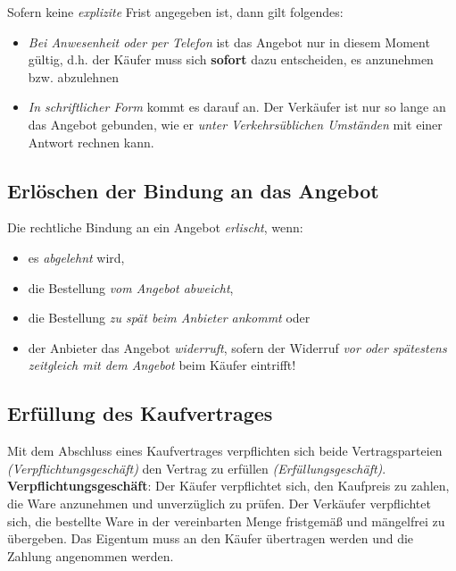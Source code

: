 \documentclass[a4paper, 12pt]{report}
\begin{document}
Sofern keine \emph{explizite} Frist angegeben ist, dann gilt folgendes: 

\begin{itemize}
    \item \emph{Bei Anwesenheit oder per Telefon} ist das Angebot nur in diesem
        Moment gültig, d.h. der Käufer muss sich \textbf{sofort} dazu 
        entscheiden, es anzunehmen bzw. abzulehnen
    \item \emph{In schriftlicher Form} kommt es darauf an. Der Verkäufer ist nur 
        so lange an das Angebot gebunden, wie er \emph{unter Verkehrsüblichen 
        Umständen} mit einer Antwort rechnen kann.
\end{itemize}

\subsection{Erlöschen der Bindung an das Angebot}

Die rechtliche Bindung an ein Angebot \emph{erlischt}, wenn:

\begin{itemize}
    \item es \emph{abgelehnt} wird, 
    \item die Bestellung \emph{vom Angebot abweicht},
    \item die Bestellung \emph{zu spät beim Anbieter ankommt} oder 
    \item der Anbieter das Angebot \emph{widerruft}, sofern der Widerruf \emph{
        vor oder spätestens zeitgleich mit dem Angebot} beim Käufer 
        eintrifft!
\end{itemize}

\subsection{Erfüllung des Kaufvertrages}

Mit dem Abschluss eines Kaufvertrages verpflichten sich beide Vertragsparteien
\emph{(Verpflichtungsgeschäft)} den Vertrag zu erfüllen 
\emph{(Erfüllungsgeschäft)}. \\

\textbf{Verpflichtungsgeschäft}: Der Käufer verpflichtet sich, den Kaufpreis zu 
zahlen, die Ware anzunehmen und unverzüglich zu prüfen. Der Verkäufer 
verpflichtet sich, die bestellte Ware in der vereinbarten Menge fristgemäß und 
mängelfrei zu übergeben. Das Eigentum muss an den Käufer übertragen werden und 
die Zahlung angenommen werden. \\
\end{document}

